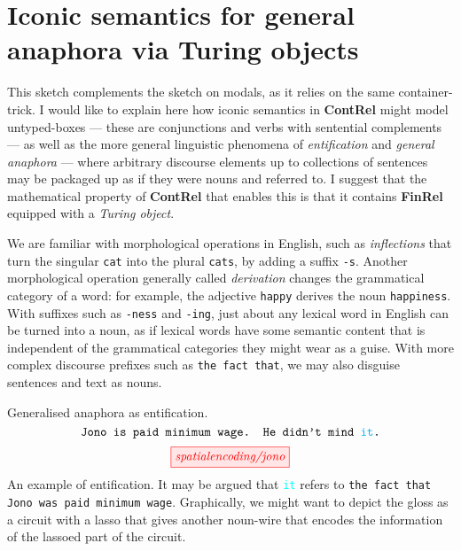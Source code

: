 \section{Iconic semantics for general anaphora via Turing objects}\label{sec:turing}

This sketch complements the sketch on modals, as it relies on the same container-trick. I would like to explain here how iconic semantics in \textbf{ContRel} might model untyped-boxes --- these are conjunctions and verbs with sentential complements --- as well as the more general linguistic phenomena of \emph{entification} and \emph{general anaphora} --- where arbitrary discourse elements up to collections of sentences may be packaged up as if they were nouns and referred to. I suggest that the mathematical property of \textbf{ContRel} that enables this is that it contains \textbf{FinRel} equipped with a \emph{Turing object}.

 We are familiar with morphological operations in English, such as \emph{inflections} that turn the singular \texttt{cat} into the plural \texttt{cats}, by adding a suffix \texttt{-s}. Another morphological operation generally called \emph{derivation} changes the grammatical category of a word: for example, the adjective \texttt{happy} derives the noun \texttt{happiness}. With suffixes such as \texttt{-ness} and \texttt{-ing}, just about any lexical word in English can be turned into a noun, as if lexical words have some semantic content that is independent of the grammatical categories they might wear as a guise. With more complex discourse prefixes such as \texttt{the fact that}, we may also disguise sentences and text as nouns.

\begin{example}{Generalised anaphora as entification.}
\[\texttt{Jono is paid minimum wage. He didn't mind \textcolor{cyan}{it}.}\]
\[\tikzfig{spatialencoding/jono}\]
An example of entification. It may be argued that \textcolor{cyan}{\texttt{it}} refers to \texttt{the fact that Jono was paid minimum wage}. Graphically, we might want to depict the gloss as a circuit with a lasso that gives another noun-wire that encodes the information of the lassoed part of the circuit.
\end{example}

